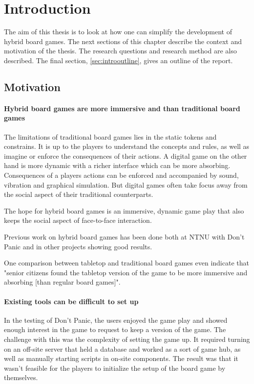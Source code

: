 \chapter{Introduction} \label{ch:introduction}
The aim of this thesis is to look at how one can simplify the development of hybrid board games.
The next sections of this chapter describe the context and motivation of the thesis. The research
questions and research method are also described. The final section, \ref{sec:introoutline}, gives an outline of the report.

\section{Motivation} \label{sec:motivation}

\subsubsection{Hybrid board games are more immersive and than traditional board games}
The limitations of traditional board games lies in the static tokens and constrains. It is up to the players to understand the concepts and rules, as well as imagine or enforce the consequences of their actions. A digital game on the other hand is more dynamic with a richer interface which can be more absorbing. Consequences of a players actions can be enforced and accompanied by sound, vibration and graphical simulation. But digital games often take focus away from the social aspect of their traditional counterparts.

The hope for hybrid board games is an immersive, dynamic game play that also keeps the social aspect of face-to-face interaction.

Previous work on hybrid board games has been done both at NTNU with Don't  Panic\cite{di2012don} and in other projects\cite{al2008designing, bakker2007weathergods} showing good results.

One comparison between tabletop and traditional board games even indicate that "senior citizens found the tabletop version of the game to be more immersive and absorbing [than regular board games]"\cite{al2008designing}.

\subsubsection{Existing tools can be difficult to set up}
In the testing of Don't Panic\cite{di2012don}, the users enjoyed the game play and showed enough interest in the game to request to keep a version of the game. The challenge with this was the complexity of setting the game up. It required turning on an off-site server that held a database and worked as a sort of game hub, as well as manually starting scripts in on-site components. The result was that it wasn't feasible for the players to initialize the setup of the board game by themselves. 

